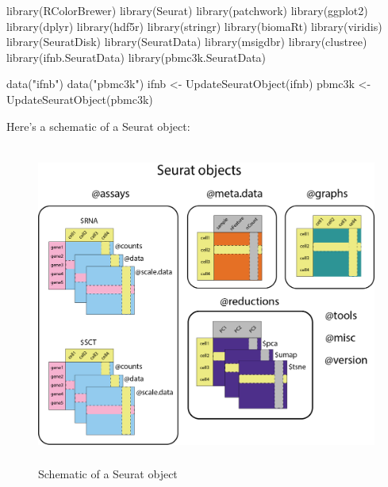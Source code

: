 \documentclass[
  letterpaper,
  DIV=11,
  numbers=noendperiod]{scrreprt}
\newenvironment{Shaded}{\begin{snugshade}}{\end{snugshade}}
\newcommand{\FunctionTok}[1]{\textcolor[rgb]{0.28,0.35,0.67}{#1}}
\newcommand{\NormalTok}[1]{\textcolor[rgb]{0.00,0.23,0.31}{#1}}
\newcommand{\OtherTok}[1]{\textcolor[rgb]{0.00,0.23,0.31}{#1}}
\newcommand{\StringTok}[1]{\textcolor[rgb]{0.13,0.47,0.30}{#1}}
\begin{document}
\begin{Shaded}
\begin{Highlighting}[]
\FunctionTok{library}\NormalTok{(RColorBrewer)}
\FunctionTok{library}\NormalTok{(Seurat)}
\FunctionTok{library}\NormalTok{(patchwork)}
\FunctionTok{library}\NormalTok{(ggplot2)}
\FunctionTok{library}\NormalTok{(dplyr)}
\FunctionTok{library}\NormalTok{(hdf5r)}
\FunctionTok{library}\NormalTok{(stringr)}
\FunctionTok{library}\NormalTok{(biomaRt)}
\FunctionTok{library}\NormalTok{(viridis)}
\FunctionTok{library}\NormalTok{(SeuratDisk)}
\FunctionTok{library}\NormalTok{(SeuratData)}
\FunctionTok{library}\NormalTok{(msigdbr)}
\FunctionTok{library}\NormalTok{(clustree)}
\FunctionTok{library}\NormalTok{(}\StringTok{\textquotesingle{}ifnb.SeuratData\textquotesingle{}}\NormalTok{)}
\FunctionTok{library}\NormalTok{(}\StringTok{\textquotesingle{}pbmc3k.SeuratData\textquotesingle{}}\NormalTok{)}

\FunctionTok{data}\NormalTok{(}\StringTok{"ifnb"}\NormalTok{)}
\FunctionTok{data}\NormalTok{(}\StringTok{"pbmc3k"}\NormalTok{)}
\NormalTok{ifnb }\OtherTok{\textless{}{-}} \FunctionTok{UpdateSeuratObject}\NormalTok{(ifnb)}
\NormalTok{pbmc3k }\OtherTok{\textless{}{-}} \FunctionTok{UpdateSeuratObject}\NormalTok{(pbmc3k)}
\end{Highlighting}
\end{Shaded}

Here's a schematic of a Seurat object:

\begin{figure}[H]

{\centering \includegraphics[width=4.89583in,height=4.16667in]{image/seurat_object.png}

}

\caption{Schematic of a Seurat object}

\end{figure}%
\end{document}
